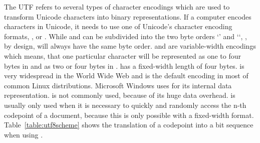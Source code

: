 \documentclass[a4paper, 12pt]{scrartcl} %
\begin{document}
The \gls{UTF} refers to several types of character
encodings which are used to transform Unicode characters into binary
representations. If a computer encodes characters in Unicode, it needs to use
one of Unicode's character encoding formats, ,
 or . While 
and  can be subdivided into the two byte orders `' and ``, , by
design, will always have the same byte order.  and
 are variable-width encodings which means, that one
particular character will be represented as one to four bytes in
 and as two or four bytes in .
 has a fixed-width length of four bytes.
 is very widespread in the World Wide Web and is the default
encoding in most of common Linux distributions. Microsoft Windows uses
 for its internal data representation.
 is not commonly used, because of its huge data overhead.
 is usually only used when it is necessary to quickly
and randomly access the n-th \gls{codepoint} of a document, because this is only
possible with a fixed-width format. Table~\ref{table:utf8scheme} shows the
translation of a \gls{codepoint} into a bit sequence when using
.

\begin{table}[H]
 \begin{center}
  \end{center}
  \caption{Scheme of  encoding \cite{wikipediautf8table}}
  \label{table:utf8scheme}
\end{table}
\end{document}
